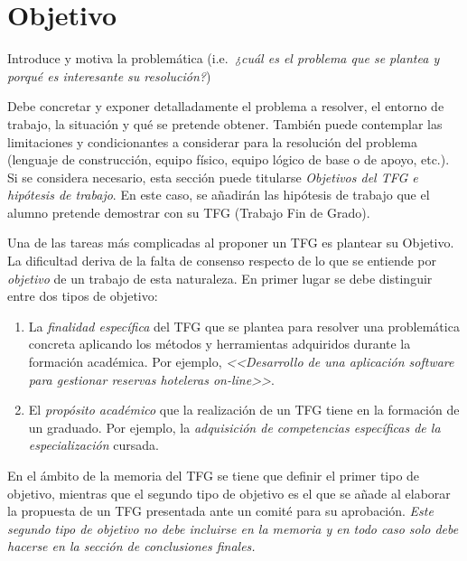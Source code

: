 \chapter{Objetivo}
\label{cap:Objetivo}

Introduce y motiva la problemática (i.e.\emph{\ ¿cuál es el problema que se plantea y porqué es interesante su resolución?})

Debe concretar y exponer detalladamente el problema a resolver, el entorno de 
trabajo, la situación y qué se pretende obtener. También puede contemplar las 
limitaciones y condicionantes a considerar para la resolución del problema 
(lenguaje de construcción, equipo físico, equipo lógico de base o de apoyo, 
etc.). Si se considera necesario, esta sección puede titularse 
\emph{Objetivos del TFG e hipótesis de trabajo}. En este caso, se añadirán 
las hipótesis de trabajo que el alumno pretende demostrar con su TFG (Trabajo 
Fin de Grado).

Una de las tareas más complicadas al proponer un TFG es plantear su \textsf{Objetivo}. La dificultad deriva de la falta de consenso respecto de lo que se entiende por \emph{objetivo} de un trabajo de esta naturaleza. En primer lugar se debe distinguir entre dos tipos de objetivo:

\begin{enumerate}
	\item La \emph{finalidad específica} del TFG que se plantea para resolver una problemática concreta aplicando los métodos y herramientas adquiridos durante la formación académica. Por ejemplo, \emph{<<Desarrollo de una aplicación software para gestionar reservas hoteleras \emph{on-line}>>}.
	
	\item El \emph{propósito académico} que la realización de un TFG tiene en la formación de un graduado. Por ejemplo, la \emph{adquisición de competencias específicas de la especialización} cursada.
\end{enumerate}

En el ámbito de la memoria del TFG se tiene que definir el primer tipo de objetivo, mientras que el segundo tipo de objetivo es el que se añade al elaborar la propuesta de un TFG presentada ante un comité para su aprobación. \emph{Este segundo tipo de objetivo no debe incluirse en la memoria y en todo caso solo debe hacerse en la sección de conclusiones finales.}

